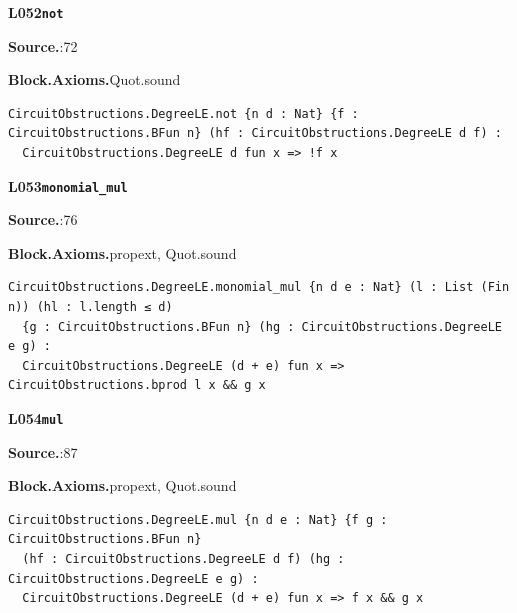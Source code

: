 \par\medskip\noindent\begin{minipage}{\textwidth}
{\small\bfseries L052\enspace\texttt{not}\par}
{\footnotesize\raggedright\textbf{Source.}\enspace{}:72\par
\textbf{Block.}\quad\textbf{Axioms.}\enspace Quot.sound\par}\nopagebreak
\begin{lstlisting}
CircuitObstructions.DegreeLE.not {n d : Nat} {f : CircuitObstructions.BFun n} (hf : CircuitObstructions.DegreeLE d f) :
  CircuitObstructions.DegreeLE d fun x => !f x
\end{lstlisting}
\end{minipage}\par

\par\medskip\noindent\begin{minipage}{\textwidth}
{\small\bfseries L053\enspace\texttt{monomial\_mul}\par}
{\footnotesize\raggedright\textbf{Source.}\enspace{}:76\par
\textbf{Block.}\quad\textbf{Axioms.}\enspace propext, Quot.sound\par}\nopagebreak
\begin{lstlisting}
CircuitObstructions.DegreeLE.monomial_mul {n d e : Nat} (l : List (Fin n)) (hl : l.length ≤ d)
  {g : CircuitObstructions.BFun n} (hg : CircuitObstructions.DegreeLE e g) :
  CircuitObstructions.DegreeLE (d + e) fun x => CircuitObstructions.bprod l x && g x
\end{lstlisting}
\end{minipage}\par

\par\medskip\noindent\begin{minipage}{\textwidth}
{\small\bfseries L054\enspace\texttt{mul}\par}
{\footnotesize\raggedright\textbf{Source.}\enspace{}:87\par
\textbf{Block.}\quad\textbf{Axioms.}\enspace propext, Quot.sound\par}\nopagebreak
\begin{lstlisting}
CircuitObstructions.DegreeLE.mul {n d e : Nat} {f g : CircuitObstructions.BFun n}
  (hf : CircuitObstructions.DegreeLE d f) (hg : CircuitObstructions.DegreeLE e g) :
  CircuitObstructions.DegreeLE (d + e) fun x => f x && g x
\end{lstlisting}
\end{minipage}\par

